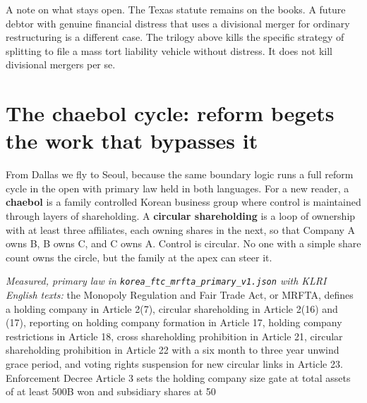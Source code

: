 A note on what stays open. The Texas statute remains on the books. A future debtor with genuine financial distress that uses a divisional merger for ordinary restructuring is a different case. The trilogy above kills the specific strategy of splitting to file a mass tort liability vehicle without distress. It does not kill divisional mergers per se.

\section{The chaebol cycle: reform begets the work that bypasses it}

From Dallas we fly to Seoul, because the same boundary logic runs a full reform cycle in the open with primary law held in both languages. For a new reader, a \textbf{chaebol} is a family controlled Korean business group where control is maintained through layers of shareholding. A \textbf{circular shareholding} is a loop of ownership with at least three affiliates, each owning shares in the next, so that Company A owns B, B owns C, and C owns A. Control is circular. No one with a simple share count owns the circle, but the family at the apex can steer it.

\textit{Measured, primary law in \texttt{korea\_ftc\_mrfta\_primary\_v1.json} with KLRI English texts:} the Monopoly Regulation and Fair Trade Act, or MRFTA, defines a holding company in Article 2(7), circular shareholding in Article 2(16) and (17), reporting on holding company formation in Article 17, holding company restrictions in Article 18, cross shareholding prohibition in Article 21, circular shareholding prohibition in Article 22 with a six month to three year unwind grace period, and voting rights suspension for new circular links in Article 23. Enforcement Decree Article 3 sets the holding company size gate at total assets of at least 500B won and subsidiary shares at 50%

